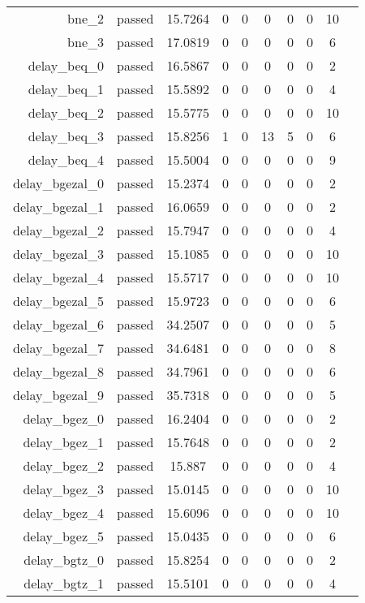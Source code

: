 \begin{longtable}{r|ccccccccc}
    bne\_2 & passed & 15.7264 & 0 & 0 & 0 & 0 & 0 & 10 \\
    bne\_3 & passed & 17.0819 & 0 & 0 & 0 & 0 & 0 & 6 \\
    delay\_beq\_0 & passed & 16.5867 & 0 & 0 & 0 & 0 & 0 & 2 \\
    delay\_beq\_1 & passed & 15.5892 & 0 & 0 & 0 & 0 & 0 & 4 \\
    delay\_beq\_2 & passed & 15.5775 & 0 & 0 & 0 & 0 & 0 & 10 \\
    delay\_beq\_3 & passed & 15.8256 & 1 & 0 & 13 & 5 & 0 & 6 \\
    delay\_beq\_4 & passed & 15.5004 & 0 & 0 & 0 & 0 & 0 & 9 \\
    delay\_bgezal\_0 & passed & 15.2374 & 0 & 0 & 0 & 0 & 0 & 2 \\
    delay\_bgezal\_1 & passed & 16.0659 & 0 & 0 & 0 & 0 & 0 & 2 \\
    delay\_bgezal\_2 & passed & 15.7947 & 0 & 0 & 0 & 0 & 0 & 4 \\
    delay\_bgezal\_3 & passed & 15.1085 & 0 & 0 & 0 & 0 & 0 & 10 \\
    delay\_bgezal\_4 & passed & 15.5717 & 0 & 0 & 0 & 0 & 0 & 10 \\
    delay\_bgezal\_5 & passed & 15.9723 & 0 & 0 & 0 & 0 & 0 & 6 \\
    delay\_bgezal\_6 & passed & 34.2507 & 0 & 0 & 0 & 0 & 0 & 5 \\
    delay\_bgezal\_7 & passed & 34.6481 & 0 & 0 & 0 & 0 & 0 & 8 \\
    delay\_bgezal\_8 & passed & 34.7961 & 0 & 0 & 0 & 0 & 0 & 6 \\
    delay\_bgezal\_9 & passed & 35.7318 & 0 & 0 & 0 & 0 & 0 & 5 \\
    delay\_bgez\_0 & passed & 16.2404 & 0 & 0 & 0 & 0 & 0 & 2 \\
    delay\_bgez\_1 & passed & 15.7648 & 0 & 0 & 0 & 0 & 0 & 2 \\
    delay\_bgez\_2 & passed & 15.887 & 0 & 0 & 0 & 0 & 0 & 4 \\
    delay\_bgez\_3 & passed & 15.0145 & 0 & 0 & 0 & 0 & 0 & 10 \\
    delay\_bgez\_4 & passed & 15.6096 & 0 & 0 & 0 & 0 & 0 & 10 \\
    delay\_bgez\_5 & passed & 15.0435 & 0 & 0 & 0 & 0 & 0 & 6 \\
    delay\_bgtz\_0 & passed & 15.8254 & 0 & 0 & 0 & 0 & 0 & 2 \\
    delay\_bgtz\_1 & passed & 15.5101 & 0 & 0 & 0 & 0 & 0 & 4 \\

\end{longtable}
